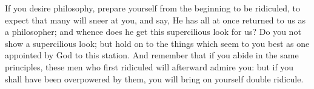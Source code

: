 If you desire philosophy, prepare yourself  from the beginning to be ridiculed,
to expect that many will sneer at you,  and say, He has all at once returned to
us as a philosopher;  and whence does he get this supercilious  look for us? Do
you not show a  supercilious look; but hold on to the things  which seem to you
best as one appointed by God to this station. And remember that if you abide in
the same principles,  these men who first ridiculed will  afterward admire you:
but if  you shall  have been overpowered  by them, you  will bring  on yourself
double ridicule.
